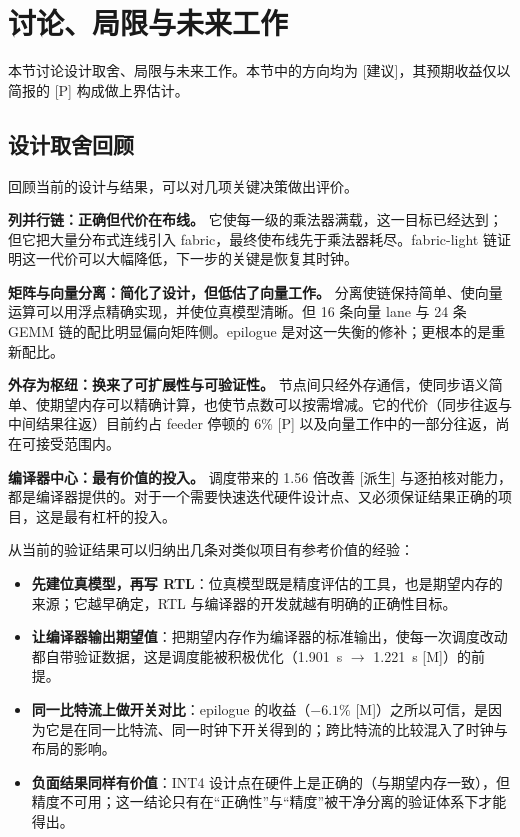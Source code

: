\documentclass[a4paper,10.5pt]{ctexart}
\newcommand{\tM}{\textsf{[M]}}              %
\newcommand{\tP}{\textsf{[P]}}              %
\newcommand{\tD}{\textsf{[派生]}}           %
\newcommand{\tR}{\textsf{[建议]}}           %
\begin{document}
\section{讨论、局限与未来工作}\label{sec:risk}

本节讨论设计取舍、局限与未来工作。本节中的方向均为 \tR，其预期收益仅以简报的 \tP{} 构成做上界估计。

\subsection{设计取舍回顾}

回顾当前的设计与结果，可以对几项关键决策做出评价。

\textbf{列并行链：正确但代价在布线。} 它使每一级的乘法器满载，这一目标已经达到；但它把大量分布式连线引入 fabric，最终使布线先于乘法器耗尽。fabric-light 链证明这一代价可以大幅降低，下一步的关键是恢复其时钟。

\textbf{矩阵与向量分离：简化了设计，但低估了向量工作。} 分离使链保持简单、使向量运算可以用浮点精确实现，并使位真模型清晰。但 16 条向量 lane 与 24 条 GEMM 链的配比明显偏向矩阵侧。epilogue 是对这一失衡的修补；更根本的是重新配比。

\textbf{外存为枢纽：换来了可扩展性与可验证性。} 节点间只经外存通信，使同步语义简单、使期望内存可以精确计算，也使节点数可以按需增减。它的代价（同步往返与中间结果往返）目前约占 feeder 停顿的 6\% \tP{} 以及向量工作中的一部分往返，尚在可接受范围内。

\textbf{编译器中心：最有价值的投入。} 调度带来的 1.56 倍改善 \tD{} 与逐拍核对能力，都是编译器提供的。对于一个需要快速迭代硬件设计点、又必须保证结果正确的项目，这是最有杠杆的投入。

从当前的验证结果可以归纳出几条对类似项目有参考价值的经验：
\begin{itemize}
  \item \textbf{先建位真模型，再写 RTL}：位真模型既是精度评估的工具，也是期望内存的来源；它越早确定，RTL 与编译器的开发就越有明确的正确性目标。
  \item \textbf{让编译器输出期望值}：把期望内存作为编译器的标准输出，使每一次调度改动都自带验证数据，这是调度能被积极优化（1.901~s $\to$ 1.221~s \tM）的前提。
  \item \textbf{同一比特流上做开关对比}：epilogue 的收益（$-6.1\%$ \tM）之所以可信，是因为它是在同一比特流、同一时钟下开关得到的；跨比特流的比较混入了时钟与布局的影响。
  \item \textbf{负面结果同样有价值}：INT4 设计点在硬件上是正确的（与期望内存一致），但精度不可用；这一结论只有在“正确性”与“精度”被干净分离的验证体系下才能得出。
\end{itemize}
\end{document}
